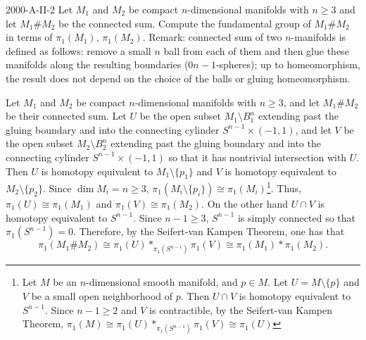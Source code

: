 \documentclass{article}
\begin{document}
	\begin{prb}{2000-A-II-2}
		Let $M_{1}$ and $M_{2}$ be compact $n$-dimensional manifolds with $n \geq 3$ and let $M_{1} \# M_{2}$ be the connected sum. Compute the fundamental group of $M_{1} \# M_{2}$ in terms of $\pi_{1}(M_{1})$, $\pi_{1}(M_{2})$.  Remark: connected sum of two $n$-manifolds is defined as follows: remove a small $n$ ball from each of them and then glue these manifolds along the resulting boundaries (0$n-1$-spheres); up to homeomorphism, the result does not depend on the choice of the balls or gluing homeomorphism. 
	\end{prb}
	Let $M_{1}$ and $M_{2}$ be compact $n$-dimensional manifolds with $n \geq 3$, and let $M_{1}\# M_{2}$ be their connected sum. Let $U$ be the open subset $M_{1}\setminus B_{1}^{n}$ extending past the gluing boundary and into the connecting cylinder $S^{n - 1} \times (-1,1)$, and let $V$ be the open subset $M_{2}\setminus B_{2}^{n}$ extending past the gluing boundary and into the connecting cylinder $S^{n - 1} \times (-1,1)$ so that it has nontrivial intersection with $U$. Then $U$ is homotopy equivalent to $M_{1}\setminus \{p_{1}\}$ and $V$ is homotopy equivalent to $M_{2}\setminus \{p_{2}\}$. Since $\dim{M_{i}} = n \geq 3$, $\pi_{1}(M_{i}\setminus \{p_{i}\}) \cong \pi_{1}(M_{i})$\footnote{Let $M$ be an $n$-dimensional smooth manifold, and $p \in M$. Let $U = M \setminus \{p\}$ and $V$ be a small open neighborhood of $p$. Then $U \cap V$ is homotopy equivalent to $S^{n-1}$. Since $n - 1 \geq 2$ and $V$ is contractible, by the Seifert-van Kampen Theorem, $\pi_{1}(M) \cong \pi_{1}(U) \ast_{\pi_{1}(S^{n-1})} \pi_{1}(V) \cong \pi_{1}(U)$}. Thus, $\pi_{1}(U)\cong  \pi_{1}(M_{1})$ and $\pi_{1}(V) \cong \pi_{1}(M_{2})$. On the other hand $U \cap V$ is homotopy equivalent to $S^{n -1}$. Since $n - 1\geq 3$, $S^{n -1}$ is simply connected so that $\pi_{1}(S^{n-1}) = 0$. Therefore, by the Seifert-van Kampen Theorem, one has that 
	\begin{equation*}
		\pi_{1}(M_{1}\# M_{2}) \cong \pi_{1}(U) \ast_{\pi_{1}(S^{n-1})} \pi_{1}(V) \cong \pi_{1}(M_{1}) \ast \pi_{1}(M_{2}). 
	\end{equation*} 
	
\end{document}
